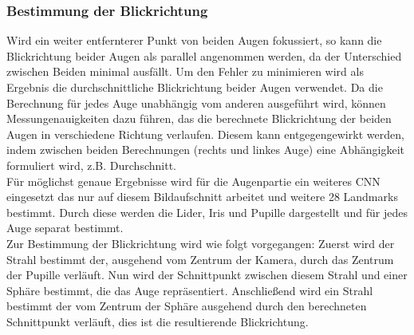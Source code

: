 \subsubsection{Bestimmung der Blickrichtung}
\label{OpenFace_Blickrichtung}
Wird ein weiter entfernterer Punkt von beiden Augen fokussiert, so kann die Blickrichtung beider Augen als parallel angenommen werden, da der Unterschied zwischen Beiden minimal ausfällt. Um den Fehler zu minimieren wird als Ergebnis die durchschnittliche Blickrichtung beider Augen verwendet. Da die Berechnung für jedes Auge unabhängig vom anderen ausgeführt wird, können Messungenauigkeiten dazu führen, das die berechnete Blickrichtung der beiden Augen in verschiedene Richtung verlaufen. Diesem kann entgegengewirkt werden, indem zwischen beiden Berechnungen (rechts und linkes Auge) eine Abhängigkeit formuliert wird, z.B. Durchschnitt.\\
Für möglichst genaue Ergebnisse wird für die Augenpartie ein weiteres CNN eingesetzt das nur auf diesem Bildaufschnitt arbeitet und weitere 28 Landmarks bestimmt. Durch diese werden die Lider, Iris und Pupille dargestellt und für jedes Auge separat bestimmt.\\
Zur Bestimmung der Blickrichtung wird wie folgt vorgegangen: Zuerst wird der Strahl bestimmt der, ausgehend vom Zentrum der Kamera, durch das Zentrum der Pupille verläuft. Nun wird der Schnittpunkt zwischen diesem Strahl und einer Sphäre bestimmt, die das Auge repräsentiert. Anschließend wird ein Strahl bestimmt der vom Zentrum der Sphäre ausgehend durch den berechneten Schnittpunkt verläuft, dies ist die resultierende Blickrichtung.\cite{OpenFace}
